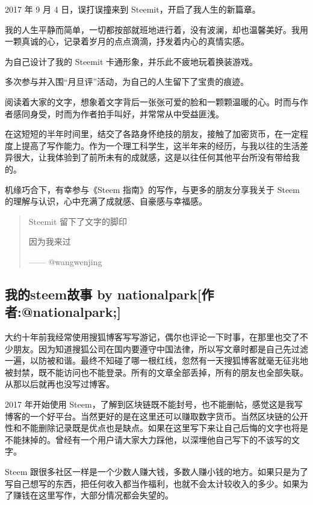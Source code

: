 \documentclass[]{ctexbook}
\begin{document}
2017 年 9 月 4 日，误打误撞来到 Steemit，开启了我人生的新篇章。

我的人生平静而简单，一切都按部就班地进行着，没有波澜，却也温馨美好。我用一颗真诚的心，记录着岁月的点点滴滴，抒发着内心的真情实感。

为自己设计了我的 Steemit 卡通形象，并乐此不疲地玩着换装游戏。

多次参与并入围``月旦评''活动，为自己的人生留下了宝贵的痕迹。

阅读着大家的文字，想象着文字背后一张张可爱的脸和一颗颗温暖的心。时而与作者感同身受，时而为作者拍手叫好，并常常从中受益匪浅。

在这短短的半年时间里，结交了各路身怀绝技的朋友，接触了加密货币，在一定程度上提高了写作能力。作为一个理工科学生，这半年来的经历，与我以往的生活差异很大，让我体验到了前所未有的成就感，这是以往任何其他平台所没有带给我的。

机缘巧合下，有幸参与《Steem 指南》的写作，与更多的朋友分享我关于 Steem 的理解与认识，心中充满了成就感、自豪感与幸福感。

\begin{quote}
Steemit 留下了文字的脚印

因为我来过

\begin{flushright}------ @wangwenjing\end{flushright}
\end{quote}

\hypertarget{steem-by-nationalparknationalpark}{%
\subsection{我的steem故事 by nationalpark{[}作者:@nationalpark;{]}}\label{steem-by-nationalparknationalpark}}

大约十年前我经常使用搜狐博客写写游记，偶尔也评论一下时事，在那里也交了不少朋友。因为知道搜狐公司在国内要遵守中国法律，所以写文章时都是自己先过滤一遍，以防被和谐。最终不知碰了哪一根红线，忽然有一天搜狐博客就毫无征兆地被封禁，既不能访问也不能登录。所有的文章全部丢掉，所有的朋友也全部失联。从那以后就再也没写过博客。

2017 年开始使用 Steem，了解到区块链既不能封号，也不能删帖，感觉这是我写博客的一个好平台。当然更好的是在这里还可以赚取数字货币。当然区块链的公开性和不能删除记录既是优点也是缺点。如果在这里写下来让自己后悔的文字也将是不能抹掉的。曾经有一个用户请大家大力踩他，以深埋他自己写下的不该写的文字。

Steem 跟很多社区一样是一个少数人赚大钱，多数人赚小钱的地方。如果只是为了写自己想写的东西，把任何收入都当作福利，也就不会太计较收入的多少。如果为了赚钱在这里写作，大部分情况都会失望的。
\end{document}
